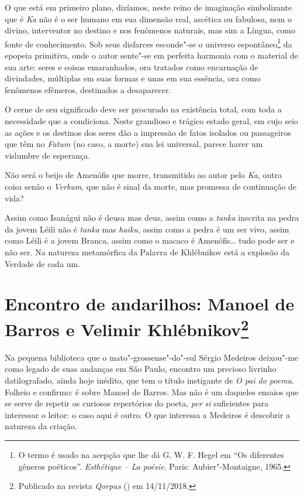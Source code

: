 O que está em primeiro plano, dizíamos, neste reino de imaginação
simbolizante que é \emph{Ka} não é o ser humano em sua dimensão real,
ascética ou fabulosa, nem o divino, interventor no destino e nos
fenômenos naturais, mas sim a Língua, como fonte de conhecimento. Sob
seus disfarces esconde"-se o universo espontâneo\footnote{O termo é usado
  na acepção que lhe dá G. W. F. Hegel em ``Os diferentes gêneros
  poéticos''. \emph{Esthétique -- La poésie}. Paris: Aubier"-Montaigne,
  1965.} da epopeia primitiva, onde o autor sente"-se em perfeita
harmonia com o material de sua arte: seres e coisas emaranhados, ora
tratados como encarnação de divindades, múltiplas em suas formas e unas
em sua essência, ora como fenômenos efêmeros, destinados a desaparecer.

O cerne de seu significado deve ser procurado na existência total,
com toda a necessidade que a condiciona. Neste grandioso e trágico
estado geral, em cujo seio as ações e os destinos dos seres dão a
impressão de fatos isolados ou passageiros que têm no \emph{Fatum}
(no caso, a morte) sua lei universal, parece haver um vislumbre de
esperança.

Não será o beijo de Amenófis que morre, transmitido ao autor pelo
\emph{Ka}, outra coisa senão o \emph{Verbum}, que não é sinal da morte,
mas promessa de continuação de vida?

Assim como Isanágui não é deusa mas deus, assim como a \emph{tanka}
inscrita na pedra da jovem Léili não é \emph{tanka} mas \emph{haiku},
assim como a pedra é um ser vivo, assim como Léili é a jovem Branca,
assim como o macaco é Amenófis\ldots{} tudo pode ser e não ser. Na natureza
metamórfica da Palavra de Khlébnikov está a explosão da Verdade de cada
um.

\chapter{Encontro de andarilhos: Manoel de Barros e Velimir Khlébnikov\footnote{Publicado na revista
  \emph{Qorpus} (\protect{}) em 14/11/2018.}}
\label{andarilhos}

Na pequena biblioteca que o mato"-grossense"-do"-sul Sérgio Medeiros
deixou"-me como legado de suas andanças em São Paulo, encontro um
precioso livrinho datilografado, ainda hoje inédito, que tem o título
instigante de \emph{O pai do poema}. Folheio e confirmo: é sobre Manoel
de Barros. Mas não é um daqueles ensaios que se serve de repetir os
curiosos repertórios do poeta, \emph{per si} suficientes para interessar
o leitor: o caso aqui é outro. O que interessa a Medeiros é descobrir a
natureza da criação.

